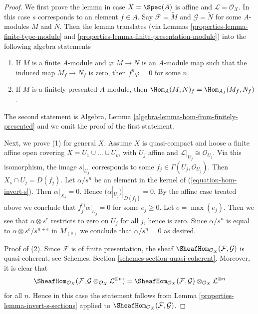\begin{proof}

We first prove the lemma in case $X = \Spec(A)$ is affine
and $\mathcal{L} = \mathcal{O}_X$. In this case $s$ corresponds
to an element $f \in A$. Say
$\mathcal{F} = \widetilde{M}$ and $\mathcal{G} = \widetilde{N}$
for some $A$-modules $M$ and $N$. Then the lemma translates
(via Lemmas \ref{properties-lemma-finite-type-module} and
\ref{properties-lemma-finite-presentation-module}) into
the following algebra statements
\begin{enumerate}
\item If $M$ is a finite $A$-module and $\varphi : M \to N$ is
an $A$-module map such that the induced map $M_f \to N_f$ is zero,
then $f^n\varphi = 0$ for some $n$.
\item If $M$ is a finitely presented $A$-module, then
$\Hom_A(M, N)_f = \Hom_{A_f}(M_f, N_f)$.
\end{enumerate}
The second statement is
Algebra, Lemma \ref{algebra-lemma-hom-from-finitely-presented} and we omit
the proof of the first statement.

\medskip\noindent
Next, we prove (1) for general $X$.
Assume $X$ is quasi-compact and hoose a finite affine open covering
$X = U_1 \cup \ldots \cup U_m$ with $U_j$ affine and
$\mathcal{L}|_{U_j} \cong \mathcal{O}_{U_j}$. Via this isomorphism,
the image $s|_{U_j}$ corresponds to some
$f_j \in \Gamma(U_j, \mathcal{O}_{U_j})$. Then
$X_s \cap U_j = D(f_j)$.
Let $\alpha/s^n$ be an element in the kernel of
(\ref{equation-hom-invert-s}). Then $\alpha|_{X_s} = 0$.
Hence $(\alpha|_{U_j})|_{D(f_j)} = 0$. By the affine case treated above
we conclude that $f_j^{e_j} \alpha|_{U_j} = 0$ for some
$e_j \geq 0$. Let $e = \max(e_j)$. Then we see that $\alpha \otimes s^e$
restricts to zero on $U_j$ for all $j$, hence is zero. Since $\alpha/s^n$
is equal to $\alpha \otimes s^e/s^{n + e}$ in $M_{(s)}$ we conclude that
$\alpha/s^n = 0$ as desired.

\medskip\noindent
Proof of (2). Since $\mathcal{F}$ is of finite presentation, the
sheaf $\SheafHom_{\mathcal{O}_X}(\mathcal{F}, \mathcal{G})$ is
quasi-coherent, see Schemes, Section \ref{schemes-section-quasi-coherent}.
Moreover, it is clear that
$$
\SheafHom_{\mathcal{O}_X}(\mathcal{F},
\mathcal{G} \otimes_{\mathcal{O}_X} \mathcal{L}^{\otimes n}) =
\SheafHom_{\mathcal{O}_X}(\mathcal{F}, \mathcal{G})
\otimes_{\mathcal{O}_X} \mathcal{L}^{\otimes n}
$$
for all $n$. Hence in this case the statement follows from
Lemma \ref{properties-lemma-invert-s-sections} applied to
$\SheafHom_{\mathcal{O}_X}(\mathcal{F}, \mathcal{G})$.
\end{proof}

